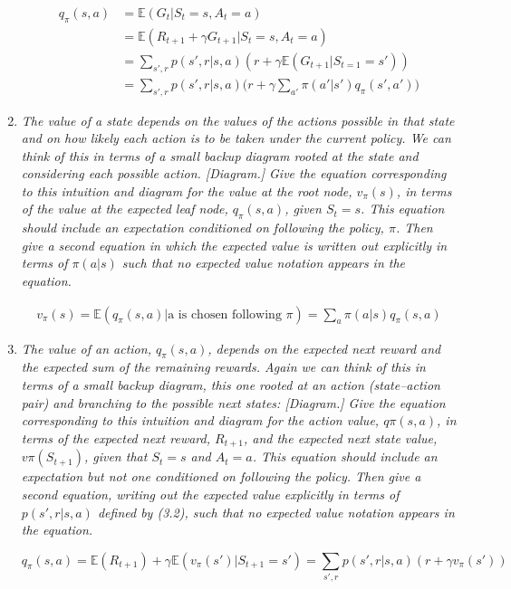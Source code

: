 \documentclass[12pt,a4paper]{article}
\begin{document}
\begin{enumerate}
  \begin{align*}
  q_\pi(s, a) & = \mathbb{E}(G_t | S_t = s, A_t = a)\\
  & = \mathbb{E}(R_{t + 1} + \gamma G_{t + 1} | S_t = s, A_t = a)\\
  & = \sum\limits_{s', r} p(s', r | s, a) (r + \gamma \mathbb{E} (G_{t + 1} | S_{t = 1} = s'))\\
  & = \sum\limits_{s', r} p(s', r | s, a) \Big(r + \gamma \sum\limits_{a'}\pi(a' | s') q_\pi(s', a')\Big)
  \end{align*}

\item
 \textit{The value of a state depends on the values of the actions possible in that
  state and on how likely each action is to be taken under the current policy. We can
  think of this in terms of a small backup diagram rooted at the state and considering each
  possible action. [Diagram.]
  Give the equation corresponding to this intuition and diagram for the value at the root
  node, $v_\pi(s)$, in terms of the value at the expected leaf node, $q_\pi(s, a)$, given
  $S_t = s$. This equation should include an expectation conditioned on following the policy,
  $\pi$. Then give a second equation in which the expected value is written out explicitly
  in terms of $\pi(a|s)$ such that no expected value notation appears in the equation.}

  \begin{align*}
    v_\pi(s) = \mathbb{E}(q_\pi(s, a) | \text{a is chosen following }\pi) = \sum\limits_a \pi(a|s) q_\pi(s, a)
  \end{align*}

\item
  \textit{The value of an action, $q_\pi(s, a)$, depends on the expected next reward and
  the expected sum of the remaining rewards. Again we can think of this in terms of a
  small backup diagram, this one rooted at an action (state–action pair) and branching to
  the possible next states: [Diagram.]
  Give the equation corresponding to this intuition and diagram for the action value,
  $q\pi(s, a)$, in terms of the expected next reward, $R_{t+1}$, and the expected next state value,
  $v\pi(S_{t+1})$, given that $S_t = s$ and $A_t = a$. This equation should include an expectation but
  not one conditioned on following the policy. Then give a second equation, writing out the
  expected value explicitly in terms of $p(s', r|s, a)$ defined by (3.2), such that no expected
  value notation appears in the equation.}

  \[q_\pi(s, a) = \mathbb{E}(R_{t + 1}) + \gamma \mathbb{E} (v_\pi (s') | S_{t + 1} = s')
  = \sum\limits_{s', r} p(s', r | s, a) (r + \gamma v_\pi(s'))\]
\end{enumerate}
\end{document}
